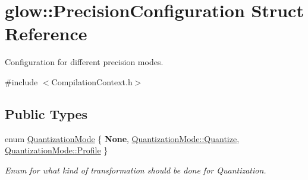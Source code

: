 \hypertarget{structglow_1_1_precision_configuration}{}\section{glow\+:\+:Precision\+Configuration Struct Reference}
\label{structglow_1_1_precision_configuration}


Configuration for different precision modes.  




{\ttfamily \#include $<$Compilation\+Context.\+h$>$}

\subsection*{Public Types}
\begin{DoxyCompactItemize}
\item 
enum \hyperlink{structglow_1_1_precision_configuration_a9a40e5e2126e4c6f3e8fe3bab25ff12c}{Quantization\+Mode} \{ {\bfseries None}, 
\hyperlink{structglow_1_1_precision_configuration_a9a40e5e2126e4c6f3e8fe3bab25ff12caca39930e22f40d10155a57dba32240bb}{Quantization\+Mode\+::\+Quantize}, 
\hyperlink{structglow_1_1_precision_configuration_a9a40e5e2126e4c6f3e8fe3bab25ff12cacce99c598cfdb9773ab041d54c3d973a}{Quantization\+Mode\+::\+Profile}
 \}\begin{DoxyCompactList}\small\item\em Enum for what kind of transformation should be done for Quantization. \end{DoxyCompactList}
\end{DoxyCompactItemize}
